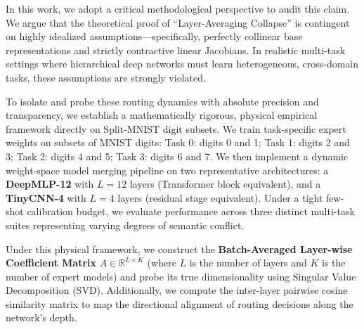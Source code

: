 In this work, we adopt a critical methodological perspective to audit this claim. We argue that the theoretical proof of ``Layer-Averaging Collapse'' is contingent on highly idealized assumptions---specifically, perfectly collinear base representations and strictly contractive linear Jacobians. In realistic multi-task settings where hierarchical deep networks must learn heterogeneous, cross-domain tasks, these assumptions are strongly violated.

To isolate and probe these routing dynamics with absolute precision and transparency, we establish a mathematically rigorous, physical empirical framework directly on Split-MNIST digit subsets. We train task-specific expert weights on subsets of MNIST digits: Task 0: digits 0 and 1; Task 1: digits 2 and 3; Task 2: digits 4 and 5; Task 3: digits 6 and 7. We then implement a dynamic weight-space model merging pipeline on two representative architectures: a \textbf{DeepMLP-12} with $L=12$ layers (Transformer block equivalent), and a \textbf{TinyCNN-4} with $L=4$ layers (residual stage equivalent). Under a tight few-shot calibration budget, we evaluate performance across three distinct multi-task suites representing varying degrees of semantic conflict.

Under this physical framework, we construct the \textbf{Batch-Averaged Layer-wise Coefficient Matrix} $A \in \mathbb{R}^{L \times K}$ (where $L$ is the number of layers and $K$ is the number of expert models) and probe its true dimensionality using Singular Value Decomposition (SVD). Additionally, we compute the inter-layer pairwise cosine similarity matrix to map the directional alignment of routing decisions along the network's depth.

